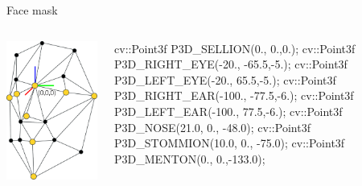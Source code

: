 \documentclass[compress]{beamer}
\begin{document}
\begin{frame}[fragile]{Face mask}

    \begin{columns}
        \begin{column}{0.5\linewidth}
            \begin{center}
                \includegraphics[width=0.8\linewidth]{face_mask}
            \end{center}
        \end{column}
        \begin{column}{0.5\linewidth}
\begin{cppcode}
cv::Point3f P3D_SELLION(0., 0.,0.);
cv::Point3f P3D_RIGHT_EYE(-20., -65.5,-5.);
cv::Point3f P3D_LEFT_EYE(-20., 65.5,-5.);
cv::Point3f P3D_RIGHT_EAR(-100., -77.5,-6.);
cv::Point3f P3D_LEFT_EAR(-100., 77.5,-6.);
cv::Point3f P3D_NOSE(21.0, 0., -48.0);
cv::Point3f P3D_STOMMION(10.0, 0., -75.0);
cv::Point3f P3D_MENTON(0., 0.,-133.0);
\end{cppcode}
        \end{column}
    \end{columns}
\end{frame}
\end{document}
